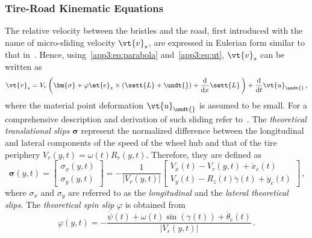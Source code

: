
\subsubsection{Tire-Road Kinematic Equations}
\label{app3:sec:kinematic_equations}

The relative velocity between the bristles and the road, first introduced with the name of micro-sliding velocity $\vt{v}_s$, are expressed in Eulerian form similar to that in~\cite{romano2019novel, romano2020unsteadystate, romano2022brush, romano2022analytical, pacejka2012tire, guiggiani2014science, limebeer2018dynamics}. Hence, using~\eqref{app3:eq:parabola} and~\eqref{app3:eq:ut}, $\vt{v}_s$ can be written as
%
\begin{equation}
  \vt{v}_s = V_r\left(\bm{\sigma} + \varphi\et{e}_z \times \left(\sett{L} + \undt{}
\right) + \dfrac{\mathrm{d}}{\mathrm{d}x}\sett{L}\,\right) + \dfrac{\mathrm{d}}{\mathrm{d}t}\vt{u}_{\undt{}
}
  \label{app3:eq:v_s} \, \text{,}
\end{equation}
%
where the material point deformation $\vt{u}_{\undt{}
}$ is assumed to be small. For a comprehensive description and derivation of such sliding refer to~\cite{rill2020road, pacejka2012tire, guiggiani2014science, limebeer2018dynamics, romano2019novel, romano2022brush, romano2022analytical}. The \emph{theoretical translational slips} $\bm{\sigma}$ represent the normalized difference between the longitudinal and lateral components of the speed of the wheel hub and that of the tire periphery $V_r(y,t) = \omega(t)R_r(y,t)$. Therefore, they are defined as
%
\begin{equation}
  \bm{\sigma}(y,t) =
  \begin{bmatrix}
    \sigma_x(y,t) \\[0.2em]
    \sigma_y(y,t)
  \end{bmatrix}
  = -\dfrac{1}{|V_r(y,t)|}
  \begin{bmatrix}
    V_x(t) - V_r(y,t) + \dot{x}_c(t) \\[0.2em]
    V_y(t) - R_z(t)\dot{\gamma}(t) + \dot{y}_c(t)
  \end{bmatrix} \, \text{,}
\end{equation}
%
where $\sigma_x$ and $\sigma_y$ are referred to as the \emph{longitudinal} and the \emph{lateral theoretical slips}. The \emph{theoretical spin slip} $\varphi$ is obtained from
%
\begin{equation}
  \varphi(y,t) = -\dfrac{\dot{\psi}(t) + \omega(t)\sin(\gamma(t)) + \dot{\theta}_c(t)}{|V_r(y,t)|} \, \text{.}
\end{equation}
